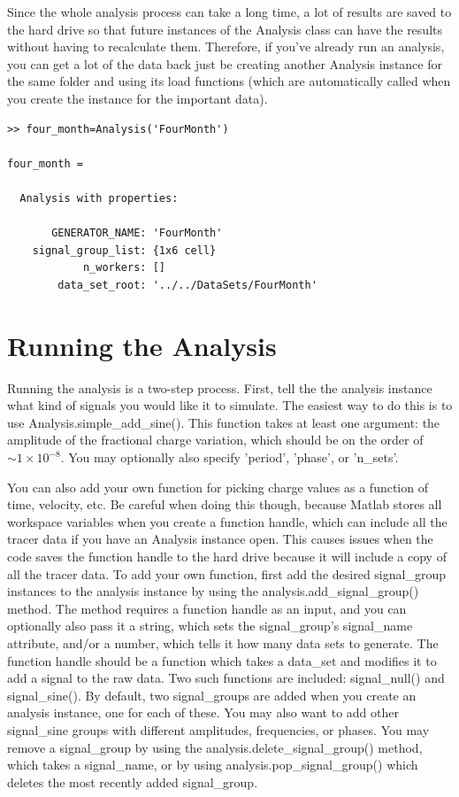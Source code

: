 \documentclass[12pt]{report}
\begin{document}
Since the whole analysis process can take a long time, a lot of results are saved to the hard drive so that future instances of the Analysis class can have the results without having to recalculate them.  Therefore, if you've already run an analysis, you can get a lot of the data back just be creating another Analysis instance for the same folder and using its load functions (which are automatically called when you create the instance for the important data).

\begin{verbatim}
>> four_month=Analysis('FourMonth')

four_month = 

  Analysis with properties:

       GENERATOR_NAME: 'FourMonth'
    signal_group_list: {1x6 cell}
            n_workers: []
        data_set_root: '../../DataSets/FourMonth'

\end{verbatim}

\section{Running the Analysis}
Running the analysis is a two-step process.  First, tell the the analysis instance what kind of signals you would like it to simulate.  The easiest way to do this is to use Analysis.simple\_add\_sine().  This function takes at least one argument: the amplitude of the fractional charge variation, which should be on the order of ~$\sim 1 \times 10^{-8}$.  You may optionally also specify 'period', 'phase', or 'n\_sets'.

You can also add your own function for picking charge values as a function of time, velocity, etc.  Be careful when doing this though, because Matlab stores all workspace variables when you create a function handle, which can include all the tracer data if you have an Analysis instance open.  This causes issues when the code saves the function handle to the hard drive because it will include a copy of all the tracer data.  To add your own function, first add the desired signal\_group instances to the analysis instance by using the analysis.add\_signal\_group() method.  The method requires a function handle as an input, and you can optionally also pass it a string, which sets the signal\_group's signal\_name attribute, and/or a number, which tells it how many data sets to generate.  The function handle should be a function which takes a data\_set and modifies it to add a signal to the raw data.  Two such functions are included: signal\_null() and signal\_sine().  By default, two signal\_groups are added when you create an analysis instance, one for each of these.  You may also want to add other signal\_sine groups with different amplitudes, frequencies, or phases.  You may remove a signal\_group by using the analysis.delete\_signal\_group() method, which takes a signal\_name, or by using analysis.pop\_signal\_group() which deletes the most recently added signal\_group.
\end{document}

